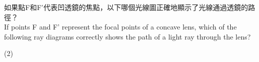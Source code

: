\documentclass[beamer=true]{standalone}
\begin{document}
\begin{eg}
    如果點F和F'代表凹透鏡的焦點，以下哪個光線圖正確地顯示了光線通過透鏡的路徑？\\If points F and F' represent the focal points of a concave lens, which of the following ray diagrams correctly shows the path of a light ray through the lens?
    \begin{tasks}[item-indent=2em,label-offset=0em,before-skip=0em,after-item-skip=0pt]
        (2)

        \task



        \task



        \task




\end{tasks}
\end{eg}
\end{document}

